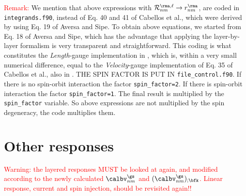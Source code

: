 \textcolor{red}{Remark:} We mention that above expressions with 
${\cal R}^{\rma,\ell}_{nm}\to r^\rma_{nm}$, are coded in
\verb=integrands.f90=, instead of Eq. 40 and 41 of Cabellos et
al.\cite{cabellosPRB09}, which were derived by using Eq. 19 of Aversa
and Sipe.\cite{aversaPRB95} To obtain above equations, we started
from Eq. 18 of Aversa and Sipe,\cite{aversaPRB95} which has the
advantage that applying the layer-by-layer formalism is very
transparent and straightforward. This coding is what constitutes the
{\it Length}-gauge implementation in \tiniba, which is, within a very
small numerical difference, equal to the {\it Velocity}-gauge
implementation of Eq. 35 of Cabellos et al.\cite{cabellosPRB09}, also
in \tiniba. 
{\color{red} THE SPIN FACTOR IS PUT IN
}\verb=file_control.f90=. 
If there is no spin-orbit interaction the 
factor \verb+spin_factor=2+.  
If there is spin-orbit interaction the 
factor \verb+spin_factor=1+. The final result is multiplied by  
the \verb=spin_factor= variable. So above expressions are not
multiplied by the spin degeneracy, the code multiplies them.   
\section{Other responses}

\textcolor{red}{Warning: the layered responses MUST be looked at
  again, and modified according to the newly calculated 
$\calbv^\gs_{nm}$  and
$(\calbv^\gs_{nm})_{;\bfk}$. Linear response, current and
spin injection, should be revisited again!!}
 
